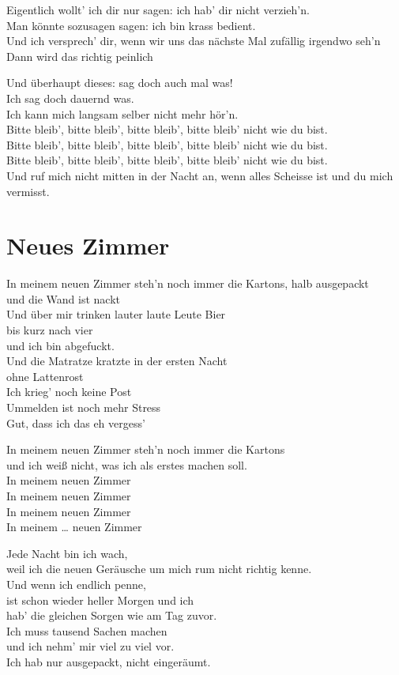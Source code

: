 \documentclass[]{book}
\begin{document}
Eigentlich wollt' ich dir nur sagen: ich hab' dir nicht verzieh'n.\\
Man könnte sozusagen sagen: ich bin krass bedient.\\
Und ich versprech' dir, wenn wir uns das nächste Mal zufällig irgendwo seh'n\\
Dann wird das richtig peinlich

Und überhaupt dieses: sag doch auch mal was!\\
Ich sag doch dauernd was.\\
Ich kann mich langsam selber nicht mehr hör'n.\\
Bitte bleib', bitte bleib', bitte bleib', bitte bleib' nicht wie du bist.\\
Bitte bleib', bitte bleib', bitte bleib', bitte bleib' nicht wie du bist.\\
Bitte bleib', bitte bleib', bitte bleib', bitte bleib' nicht wie du bist.\\
Und ruf mich nicht mitten in der Nacht an, wenn alles Scheisse ist und du mich vermisst.

\hypertarget{neues-zimmer}{%
\section{Neues Zimmer}\label{neues-zimmer}}

In meinem neuen Zimmer steh'n noch immer die Kartons, halb ausgepackt\\
und die Wand ist nackt\\
Und über mir trinken lauter laute Leute Bier\\
bis kurz nach vier\\
und ich bin abgefuckt.\\
Und die Matratze kratzte in der ersten Nacht\\
ohne Lattenrost\\
Ich krieg' noch keine Post\\
Ummelden ist noch mehr Stress\\
Gut, dass ich das eh vergess'

In meinem neuen Zimmer steh'n noch immer die Kartons\\
und ich weiß nicht, was ich als erstes machen soll.\\
In meinem neuen Zimmer\\
In meinem neuen Zimmer\\
In meinem neuen Zimmer\\
In meinem \ldots{} neuen Zimmer

Jede Nacht bin ich wach,\\
weil ich die neuen Geräusche um mich rum nicht richtig kenne.\\
Und wenn ich endlich penne,\\
ist schon wieder heller Morgen und ich\\
hab' die gleichen Sorgen wie am Tag zuvor.\\
Ich muss tausend Sachen machen\\
und ich nehm' mir viel zu viel vor.\\
Ich hab nur ausgepackt, nicht eingeräumt.
\end{document}
